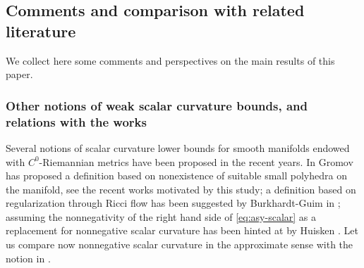 \documentclass[a4paper,12pt,reqno]{amsart}
\numberwithin{equation}{section}
\theoremstyle{plain}
\theoremstyle{definition}
\theoremstyle{remark}
\begin{document}
\subsection{Comments and comparison with related literature}

We collect here some comments and perspectives on the main results of this paper.

\subsubsection{Other notions of weak scalar curvature bounds, and relations with the works \cite{PaulaGAFA, PaulaADM}}\label{NotionsOfWeakScalarBounds}
    Several notions of scalar curvature lower bounds for smooth manifolds endowed with $C^0$-Riemannian metrics have been proposed in the recent years. In \cite{GromovScal} Gromov has proposed a definition based on {nonexistence of suitable} small polyhedra on the manifold, see the recent works \cite{ChaoLiPolyedron, BrendleInv} motivated by this study; a definition  based on regularization through Ricci flow has been suggested by Burkhardt-Guim in \cite{PaulaGAFA}; assuming the nonnegativity of the right hand side of \eqref{eq:asy-scalar} as a replacement for nonnegative scalar curvature has been hinted at by Huisken \cite{Huisken2}. Let us compare now nonnegative scalar curvature in the approximate sense  with the notion in \cite{PaulaGAFA, PaulaADM}. 
    
\end{document}
